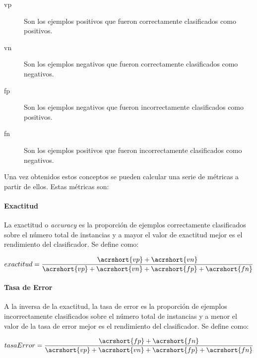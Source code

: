 \begin{description}

   \item[\acrfull{vp}] Son los ejemplos positivos que fueron correctamente
      clasificados como positivos.

   \item[\acrfull{vn}] Son los ejemplos negativos que fueron correctamente
      clasificados como negativos.

   \item[\acrfull{fp}] Son los ejemplos negativos que fueron incorrectamente
      clasificados como positivos.

   \item[\acrfull{fn}] Son los ejemplos positivos que fueron incorrectamente
      clasificados como negativos.

\end{description}

Una vez obtenidos estos conceptos se pueden calcular una serie de métricas a
partir de ellos. Estas métricas son:  

\paragraph{Exactitud}
\label{evaluacion_metricas_exactitud}

La exactitud o \textit{accuracy} es la proporción de ejemplos correctamente
clasificados sobre el número total de instancias y a mayor el valor de exactitud
mejor es el rendimiento del clasificador. Se define  como: 

\begin{equation}
   exactitud = \frac{\acrshort{vp} + \acrshort{vn}}{\acrshort{vp} +
   \acrshort{vn} + \acrshort{fp} + \acrshort{fn}}
\end{equation}

\paragraph{Tasa de Error}

A la inversa de la exactitud, la tasa de error es la proporción de ejemplos
incorrectamente clasificados sobre el número total de instancias y a menor el
valor de la tasa de error mejor es el rendimiento del clasificador. Se define
como: 

\begin{equation}
   tasaError = \frac{\acrshort{fp} + \acrshort{fn}}{\acrshort{vp} +
   \acrshort{vn} + \acrshort{fp} + \acrshort{fn}}
\end{equation}

